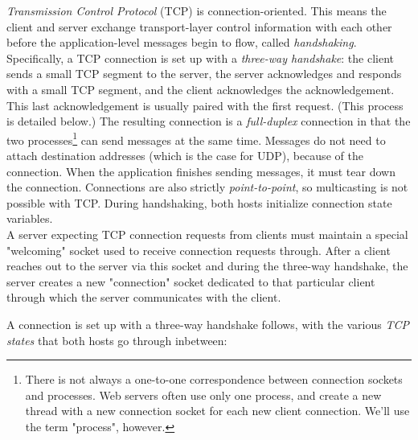 \documentclass[8pt, table, xcdraw]{article}%
\begin{document}
\emph{Transmission Control Protocol} (TCP) is connection-oriented. This means the client and server exchange transport-layer control information with each other before the application-level messages begin to flow, called \emph{handshaking}. Specifically, a TCP connection is set up with a \emph{three-way handshake}: the client sends a small TCP segment to the server, the server acknowledges and responds with a small TCP segment, and the client acknowledges the acknowledgement. This last acknowledgement is usually paired with the first request. (This process is detailed below.) The resulting connection is a \emph{full-duplex} connection in that the two processes\footnote{There is not always a one-to-one correspondence between connection sockets and processes. Web servers often use only one process, and create a new thread with a new connection socket for each new client connection. We'll use the term "process", however.} can send messages at the same time. Messages do not need to attach destination addresses (which is the case for UDP), because of the connection. When the application finishes sending messages, it must tear down the connection. Connections are also strictly \emph{point-to-point}, so multicasting is not possible with TCP. During handshaking, both hosts initialize connection state variables.\\
A server expecting TCP connection requests from clients must maintain a special "welcoming" socket used to receive connection requests through. After a client reaches out to the server via this socket and during the three-way handshake, the server creates a new "connection" socket dedicated to that particular client through which the server communicates with the client.

A connection is set up with a three-way handshake follows, with the various \emph{TCP states} that both hosts go through inbetween:
\end{document}
